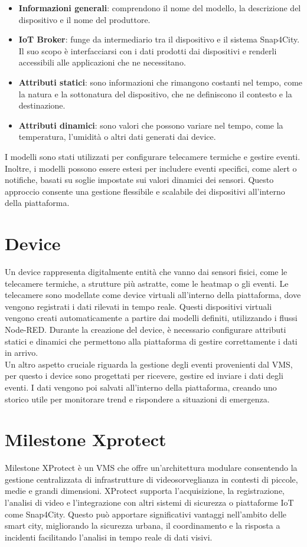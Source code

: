 \documentclass[a4paper, openright, thesis]{report}
\begin{document}
\begin{itemize}
    \item \textbf{Informazioni generali}: comprendono il nome del modello, la descrizione del dispositivo e il nome del produttore.
    \item \textbf{IoT Broker}: funge da intermediario tra il dispositivo e il sistema Snap4City. Il suo scopo è interfacciarsi con i dati prodotti dai dispositivi e renderli accessibili alle applicazioni che ne necessitano.
    \item \textbf{Attributi statici}: sono informazioni che rimangono costanti nel tempo, come la natura e la sottonatura del dispositivo, che ne definiscono il contesto e la destinazione.
    \item \textbf{Attributi dinamici}: sono valori che possono variare nel tempo, come la temperatura, l'umidità o altri dati generati dai device.
\end{itemize}
I modelli sono stati utilizzati per configurare telecamere termiche e gestire eventi. Inoltre, i modelli possono essere estesi per includere eventi specifici, come alert o notifiche, basati su soglie impostate sui valori dinamici dei sensori. Questo approccio consente una gestione flessibile e scalabile dei dispositivi all'interno della piattaforma.

\section{Device}

Un device rappresenta digitalmente entità che vanno dai sensori fisici, come le telecamere termiche, a strutture più astratte, come le heatmap o gli eventi.
Le telecamere sono modellate come device virtuali all'interno della piattaforma, dove vengono registrati i dati rilevati in tempo reale. Questi dispositivi virtuali vengono creati automaticamente a partire dai modelli definiti, utilizzando i flussi Node-RED. Durante la creazione del device, è necessario configurare attributi statici e dinamici che permettono alla piattaforma di gestire correttamente i dati in arrivo.\\ 
Un altro aspetto cruciale riguarda la gestione degli eventi provenienti dal VMS, per questo i device sono progettati per ricevere, gestire ed inviare i dati degli eventi. I dati vengono poi salvati all'interno della piattaforma, creando uno storico utile per monitorare trend e rispondere a situazioni di emergenza.

\section{Milestone Xprotect}
Milestone XProtect è un VMS che offre un'architettura modulare consentendo la gestione centralizzata di infrastrutture di videosorveglianza in contesti di piccole, medie e grandi dimensioni. XProtect supporta l'acquisizione, la registrazione, l'analisi di video e l'integrazione con altri sistemi di sicurezza o piattaforme IoT come Snap4City. Questo può apportare significativi vantaggi nell'ambito delle smart city, migliorando la sicurezza urbana, il coordinamento e la risposta a incidenti facilitando l'analisi in tempo reale di dati visivi.
\end{document}
